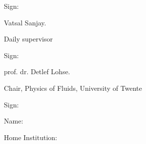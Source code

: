 \documentclass[a4paper,10pt]{article}
\begin{document}
\noindent
Sign: \hrulefill

\hspace*{0mm}\phantom{Sign: }Vatsal Sanjay.

\hspace*{0mm}\phantom{Sign: }Daily supervisor

\vspace{20mm}

\noindent
Sign: \hrulefill

\hspace*{0mm}\phantom{Sign: }prof. dr. Detlef Lohse.

\hspace*{0mm}\phantom{Sign: }Chair, Physics of Fluids, University of Twente

\vspace{20mm}
\noindent
Sign: \hrulefill

\hspace*{0mm}\phantom{Sign: }Name:

\hspace*{0mm}\phantom{Sign: }Home Institution:
\vspace{15mm}



\end{document}

